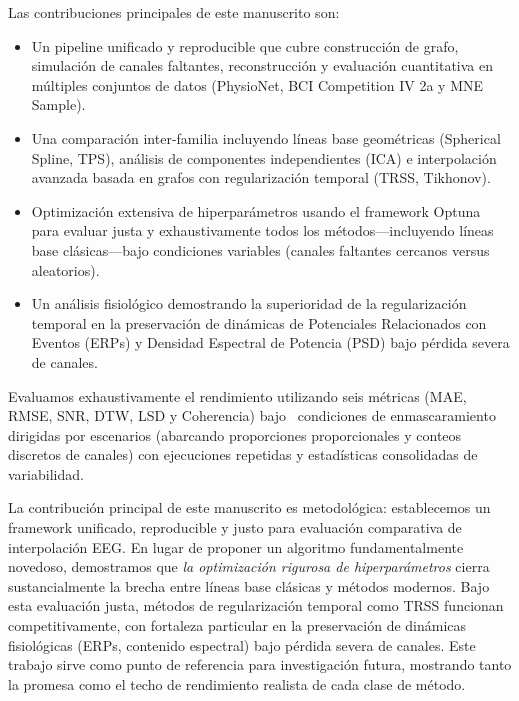 Las contribuciones principales de este manuscrito son:
\begin{itemize}
\item Un pipeline unificado y reproducible que cubre construcción de grafo, simulación de canales faltantes, reconstrucción y evaluación cuantitativa en múltiples conjuntos de datos (PhysioNet, BCI Competition IV 2a y MNE Sample).
\item Una comparación inter-familia incluyendo líneas base geométricas (Spherical Spline, TPS), análisis de componentes independientes (ICA) e interpolación avanzada basada en grafos con regularización temporal (TRSS, Tikhonov).
\item Optimización extensiva de hiperparámetros usando el framework Optuna para evaluar justa y exhaustivamente todos los métodos---incluyendo líneas base clásicas---bajo condiciones variables (canales faltantes cercanos versus aleatorios).
\item Un análisis fisiológico demostrando la superioridad de la regularización temporal en la preservación de dinámicas de Potenciales Relacionados con Eventos (ERPs) y Densidad Espectral de Potencia (PSD) bajo pérdida severa de canales.
\end{itemize}

Evaluamos exhaustivamente el rendimiento utilizando seis métricas (MAE, RMSE, SNR, DTW, LSD y Coherencia) bajo \ResScenariosNamesEn~condiciones de enmascaramiento dirigidas por escenarios (abarcando proporciones proporcionales y conteos discretos de canales) con ejecuciones repetidas y estadísticas consolidadas de variabilidad.

La contribución principal de este manuscrito es metodológica: establecemos un framework unificado, reproducible y justo para evaluación comparativa de interpolación EEG. En lugar de proponer un algoritmo fundamentalmente novedoso, demostramos que \emph{la optimización rigurosa de hiperparámetros} cierra sustancialmente la brecha entre líneas base clásicas y métodos modernos. Bajo esta evaluación justa, métodos de regularización temporal como TRSS funcionan competitivamente, con fortaleza particular en la preservación de dinámicas fisiológicas (ERPs, contenido espectral) bajo pérdida severa de canales. Este trabajo sirve como punto de referencia para investigación futura, mostrando tanto la promesa como el techo de rendimiento realista de cada clase de método.
